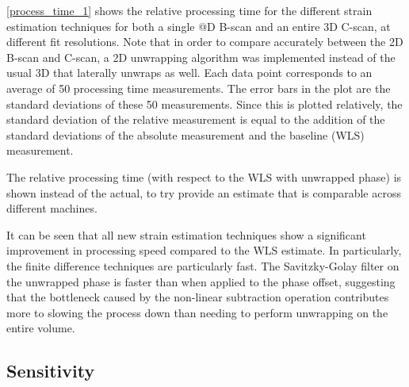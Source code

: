 \autoref{process_time_1} shows the relative processing time for the different strain estimation techniques for both a single @D B-scan and an entire 3D C-scan, at different fit resolutions. Note that in order to compare accurately between the 2D B-scan and C-scan, a 2D unwrapping algorithm was implemented instead of the usual 3D that laterally unwraps as well. Each data point corresponds to an average of 50 processing time measurements. The error bars in the plot are the standard deviations of these 50 measurements. Since this is plotted relatively, the standard deviation of the relative measurement is equal to the addition of the standard deviations of the absolute measurement and the baseline (WLS) measurement.

The relative processing time (with respect to the WLS with unwrapped phase) is shown instead of the actual, to try provide an estimate that is comparable across different machines.

It can be seen that all new strain estimation techniques show a significant improvement in processing speed compared to the WLS estimate. In particularly, the finite difference techniques are particularly fast. The Savitzky-Golay filter on the unwrapped phase is faster than when applied to the phase offset, suggesting that the bottleneck caused by the non-linear subtraction operation contributes more to slowing the process down than needing to perform unwrapping on the entire volume. 

\subsection{Sensitivity}

